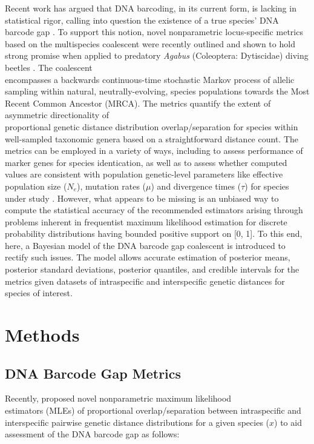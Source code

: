 \documentclass[12pt]{article}
\begin{document}
Recent work has argued that DNA barcoding, in its current form, is lacking in statistical rigor, calling into question the existence of a true species' DNA barcode gap \citep{phillips2022lack}. To support this notion, novel nonparametric locus-specific metrics based on the multispecies coalescent \citep{rannala2003bayes, yang2017bayesian} were recently outlined and shown to hold strong promise when applied to predatory \textit{Agabus} (Coleoptera: Dytiscidae) diving beetles \citep{phillips2024measure}. The coalescent \citep{kingman1982coalescent} \\ encompasses a backwards continuous-time stochastic Markov process of allelic sampling within natural, neutrally-evolving, species populations towards the Most Recent Common Ancestor (MRCA). The metrics quantify the extent of asymmetric directionality of \\ proportional genetic distance distribution overlap/separation for species within well-sampled taxonomic genera based on a straightforward distance count. The metrics can be employed in a variety of ways, including to assess performance of marker genes for species identication, as well as to assess whether computed values are consistent with population genetic-level parameters like effective population size ($N_e$), mutation rates ($\mu$) and divergence times ($\tau$) for species under study \citep{mather2019practical}. However, what appears to be missing is an unbiased way to compute the statistical accuracy of the recommended estimators arising through problems inherent in frequentist maximum likelihood estimation for discrete probability distributions having bounded positive support on [0, 1]. To this end, here, a Bayesian model of the DNA barcode gap coalescent is introduced to rectify such issues. The model allows accurate estimation of posterior means, posterior standard deviations, posterior quantiles, and credible intervals for the metrics given datasets of intraspecific and interspecific genetic distances for species of interest.


\section{Methods}

\subsection{DNA Barcode Gap Metrics}

Recently, \citet{phillips2024measure} proposed novel nonparametric maximum likelihood \\ estimators (MLEs) of proportional overlap/separation between intraspecific and interspecific pairwise genetic distance distributions for a given species ($x$) to aid assessment of the DNA barcode gap as follows:
\end{document}
